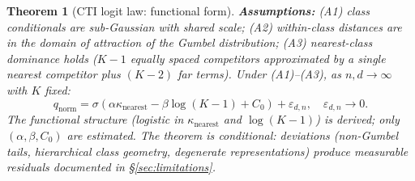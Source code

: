 \documentclass{article}
\newtheorem{theorem}{Theorem}
\begin{document}
\begin{theorem}[CTI logit law: functional form]
\label{thm:cti}
\textbf{Assumptions:} (A1) class conditionals are sub-Gaussian with shared scale; (A2) within-class distances are in the domain of attraction of the Gumbel distribution; (A3) nearest-class dominance holds ($K-1$ equally spaced competitors approximated by a single nearest competitor plus $(K-2)$ far terms). Under (A1)--(A3), as $n,d\to\infty$ with $K$ fixed:
\[
q_{\mathrm{norm}}
=\sigma\!\left(\alpha\kappa_{\mathrm{nearest}}-\beta\log(K-1)+C_0\right)+\varepsilon_{d,n},
\quad \varepsilon_{d,n}\to0.
\]
The functional structure (logistic in $\kappa_{\mathrm{nearest}}$ and $\log(K-1)$) is derived; only $(\alpha,\beta,C_0)$ are estimated. The theorem is \emph{conditional}: deviations (non-Gumbel tails, hierarchical class geometry, degenerate representations) produce measurable residuals documented in \S\ref{sec:limitations}.
\end{theorem}
\end{document}
